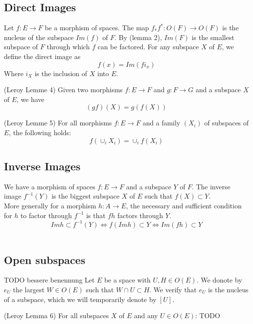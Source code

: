 \subsection{Direct Images}
\begin{definition}
    \label{def:direct_images}
    Let $f : E \rightarrow F$ be a morphism of spaces. The map $f_*f^* : O(F) \to O(F)$ is the nucleus of the subspace $Im(f)$ of $F$. By (lemma 2), $Im(F)$ is the smallest subspace of $F$ through which $f$ can be factored. For any subspace $X$ of $E$, we define the direct image as
    \[f(x) = Im(fi_x)\]
    Where $i_X$ is the inclusion of $X$ into $E$.
\end{definition}

\begin{lemma}
(Leroy Lemme 4)
    \label{lem:direct_images_transitive}
    Given two morphisms $f : E \rightarrow F$ and $g : F \rightarrow G$ and a subspace $X$ of $E$, we have
    \[(gf)(X) = g(f(X))\]
\end{lemma}

\begin{lemma}
(Leroy Lemme 5)
    \label{lem:direct_images_families}
    For all morphisms $f: E \rightarrow F$ and a family $(X_i)$ of subspaces of $E$, the following holds:
    \[f(\cup_i X_i) = \cup_i f(X_i)\]
\end{lemma}

\subsection{Inverse Images}
\begin{definition}
    \label{def:inverse_images}
    We have a morphism of spaces $f : E \rightarrow F$ and a subspace $Y$ of $F$. The inverse image $f^{-1}(Y)$ is the biggest subspace $X$ of $E$ such that $f(X) \subset Y$. \\
    More generally for a morphism $h : A \rightarrow E$, the necessary and sufficient condition for $h$ to factor through $f^{-1}$ is that $fh$ factors through $Y$.
    \[Im h \subset f^{-1}(Y)\iff f(Im h) \subset Y \iff Im(fh) \subset Y \] \
\end{definition}

\subsection{Open subspaces}
\begin{definition}[$e_U$]
    TODO bessere benennung
    \label{def:e_U}
    Let $E$ be a space with $U, H \in O(E)$. We donote by $e_U$ the largest $W \in O(E)$ such that $W \cap U \subset H$. We verify that $e_U$ is the nucleus of a subspace, which we will temporarily denote by $[U]$.
\end{definition}

\begin{lemma}
(Leroy Lemma 6)
    \label{lem:open_subspaces}
    For all subspaces $X$ of $E$ and any $U \in O(E)$:
    TODO
\end{lemma}

